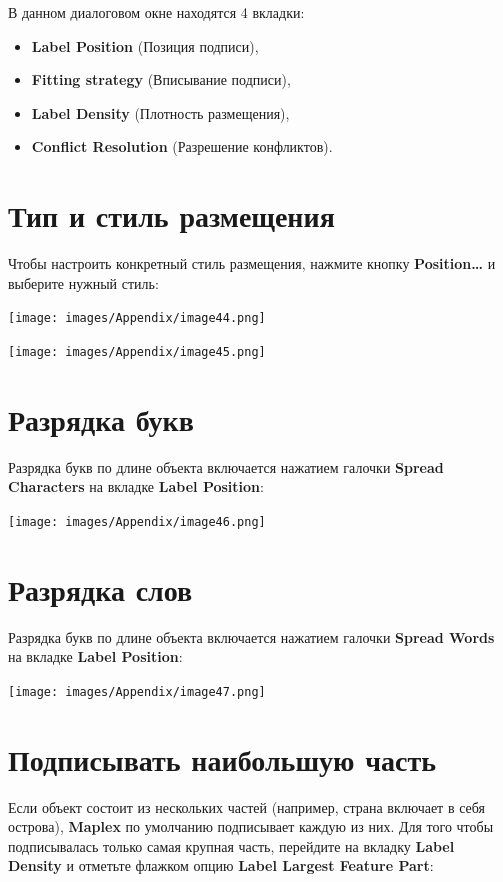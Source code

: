 \documentclass[12pt,]{book}
\begin{document}
В данном диалоговом окне находятся 4 вкладки:

\begin{itemize}
\item
  \textbf{Label Position} (Позиция подписи),
\item
  \textbf{Fitting strategy} (Вписывание подписи),
\item
  \textbf{Label Density} (Плотность размещения),
\item
  \textbf{Conflict Resolution} (Разрешение конфликтов).
\end{itemize}

\hypertarget{section-28}{%
\section{Тип и стиль размещения}\label{section-28}}

Чтобы настроить конкретный стиль размещения, нажмите кнопку \textbf{Position\ldots{}} и выберите нужный стиль:

\texttt{[image: images/Appendix/image44.png]}

\texttt{[image: images/Appendix/image45.png]}

\hypertarget{section-29}{%
\section{Разрядка букв}\label{section-29}}

Разрядка букв по длине объекта включается нажатием галочки \textbf{Spread Characters} на вкладке \textbf{Label Position}:

\texttt{[image: images/Appendix/image46.png]}

\hypertarget{section-30}{%
\section{Разрядка слов}\label{section-30}}

Разрядка букв по длине объекта включается нажатием галочки \textbf{Spread Words} на вкладке \textbf{Label Position}:

\texttt{[image: images/Appendix/image47.png]}

\hypertarget{section-31}{%
\section{Подписывать наибольшую часть}\label{section-31}}

Если объект состоит из нескольких частей (например, страна включает в себя острова), \textbf{Maplex} по умолчанию подписывает каждую из них. Для того чтобы подписывалась только самая крупная часть, перейдите на вкладку \textbf{Label Density} и отметьте флажком опцию \textbf{Label Largest Feature Part}:
\end{document}
